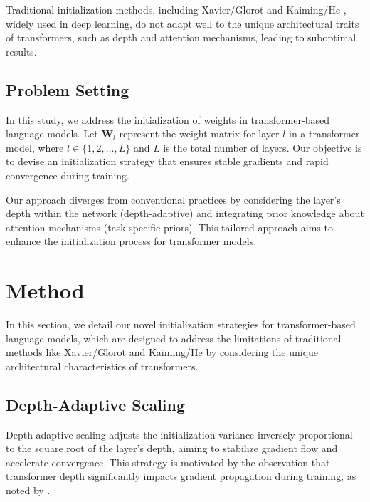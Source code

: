 \documentclass{article} %
\begin{document}
Traditional initialization methods, including Xavier/Glorot \cite{goodfellow2016deep} and Kaiming/He \cite{goodfellow2016deep}, widely used in deep learning, do not adapt well to the unique architectural traits of transformers, such as depth and attention mechanisms, leading to suboptimal results.

\subsection{Problem Setting}
\label{subsec:problem_setting}
In this study, we address the initialization of weights in transformer-based language models. Let $\mathbf{W}_l$ represent the weight matrix for layer $l$ in a transformer model, where $l \in \{1, 2, \ldots, L\}$ and $L$ is the total number of layers. Our objective is to devise an initialization strategy that ensures stable gradients and rapid convergence during training.

Our approach diverges from conventional practices by considering the layer's depth within the network (depth-adaptive) and integrating prior knowledge about attention mechanisms (task-specific priors). This tailored approach aims to enhance the initialization process for transformer models.

\section{Method}
\label{sec:method}
In this section, we detail our novel initialization strategies for transformer-based language models, which are designed to address the limitations of traditional methods like Xavier/Glorot \cite{goodfellow2016deep} and Kaiming/He \cite{goodfellow2016deep} by considering the unique architectural characteristics of transformers.

\subsection{Depth-Adaptive Scaling}
\label{subsec:depth_adaptive_scaling}
Depth-adaptive scaling adjusts the initialization variance inversely proportional to the square root of the layer's depth, aiming to stabilize gradient flow and accelerate convergence. This strategy is motivated by the observation that transformer depth significantly impacts gradient propagation during training, as noted by \citet{vaswani2017attention}.
\end{document}
